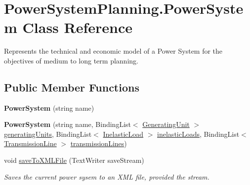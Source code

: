 \hypertarget{class_power_system_planning_1_1_power_system}{}\section{Power\+System\+Planning.\+Power\+System Class Reference}
\label{class_power_system_planning_1_1_power_system}


Represents the technical and economic model of a Power System for the objectives of medium to long term planning.  


\subsection*{Public Member Functions}
\begin{DoxyCompactItemize}
\item 
{\bfseries Power\+System} (string name)\hypertarget{class_power_system_planning_1_1_power_system_a6892a52047756c1fc3cf988695e1b787}{}\label{class_power_system_planning_1_1_power_system_a6892a52047756c1fc3cf988695e1b787}

\item 
{\bfseries Power\+System} (string name, Binding\+List$<$ \hyperlink{class_power_system_planning_1_1_generating_unit}{Generating\+Unit} $>$ \hyperlink{class_power_system_planning_1_1_power_system_a899692153e8c860b54745c503f8af765}{generating\+Units}, Binding\+List$<$ \hyperlink{class_power_system_planning_1_1_inelastic_load}{Inelastic\+Load} $>$ \hyperlink{class_power_system_planning_1_1_power_system_a0445fbb84b2deb936cfc1b7b38d8f5ed}{inelastic\+Loads}, Binding\+List$<$ \hyperlink{class_power_system_planning_1_1_transmission_line}{Transmission\+Line} $>$ \hyperlink{class_power_system_planning_1_1_power_system_a1394f9c3a23efcc0cd93acb46611c102}{transmission\+Lines})\hypertarget{class_power_system_planning_1_1_power_system_a127fe1b1817e0e5b8060210dcf6490a6}{}\label{class_power_system_planning_1_1_power_system_a127fe1b1817e0e5b8060210dcf6490a6}

\item 
void \hyperlink{class_power_system_planning_1_1_power_system_a0f3c09d821634b02e79b54c82297e9f6}{save\+To\+X\+M\+L\+File} (Text\+Writer save\+Stream)
\begin{DoxyCompactList}\small\item\em Saves the current power sysem to an X\+ML file, provided the stream. \end{DoxyCompactList}\end{DoxyCompactItemize}
